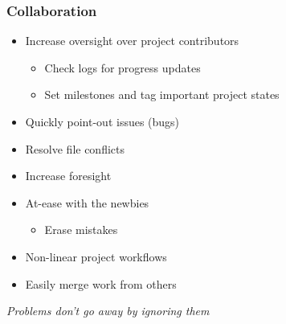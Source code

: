 \begin{frame}\frametitle{Collaboration}
    \begin{itemize}
        \item Increase oversight over project contributors
        \begin{itemize}
            \item Check logs for progress updates
            \item Set milestones and tag important project
            states
        \end{itemize}
        \item Quickly point-out issues (bugs)
        \item Resolve file conflicts
        \item Increase foresight
        \item At-ease with the newbies
        \begin{itemize}
            \item Erase mistakes
        \end{itemize}
        \item Non-linear project workflows
        \item Easily merge work from others
    \end{itemize}
\end{frame}

\begin{frame}[c]
    \begin{center}
        \emph{Problems don't go away by ignoring them}
    \end{center}
\end{frame}